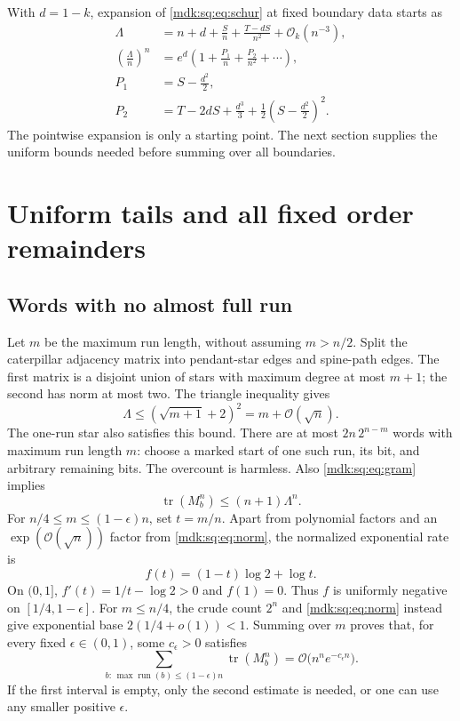 \documentclass[11pt,letterpaper]{article}
\numberwithin{equation}{section}
\theoremstyle{remark}\newtheorem{remark}[theorem]{Remark}
\newcommand{\Oh}{\mathcal O}\newcommand{\Q}{\mathbb Q}\newcommand{\N}{\mathbb N}\newcommand{\R}{\mathbb R}
\DeclareMathOperator{\tr}{tr}\DeclareMathOperator{\TV}{TV}
\begin{document}
With $d=1-k$, expansion of \eqref{mdk:sq:eq:schur} at fixed boundary data starts as
\begin{align}
\Lambda&=n+d+\frac S n+\frac{T-dS}{n^2}+\Oh_k(n^{-3}),\label{mdk:sq:eq:lambda-first}\\
\left(\frac\Lambda n\right)^n
&=e^d\left(1+\frac{P_1}{n}+\frac{P_2}{n^2}+\cdots\right),\label{mdk:sq:eq:P-formal}\\
P_1&=S-\frac{d^2}{2},\nonumber\\
P_2&=T-2dS+\frac{d^3}{3}+\frac12\left(S-\frac{d^2}{2}\right)^2.\nonumber
\end{align}
The pointwise expansion is only a starting point. The next section supplies the uniform bounds needed before summing over all boundaries.

\section{Uniform tails and all fixed order remainders}\label{mdk:sq:sec:uniform}
\subsection{Words with no almost full run}
Let $m$ be the maximum run length, without assuming $m>n/2$. Split the caterpillar adjacency matrix into pendant-star edges and spine-path edges. The first matrix is a disjoint union of stars with maximum degree at most $m+1$; the second has norm at most two. The triangle inequality gives
\begin{equation}\label{mdk:sq:eq:norm}
\Lambda\le(\sqrt{m+1}+2)^2=m+\Oh(\sqrt n).
\end{equation}
The one-run star also satisfies this bound. There are at most $2n\,2^{n-m}$ words with maximum run length $m$: choose a marked start of one such run, its bit, and arbitrary remaining bits. The overcount is harmless. Also \eqref{mdk:sq:eq:gram} implies
\[
\tr(M_b^n)\le(n+1)\Lambda^n.
\]
For $n/4\le m\le(1-\epsilon)n$, set $t=m/n$. Apart from polynomial factors and an $\exp(\Oh(\sqrt n))$ factor from \eqref{mdk:sq:eq:norm}, the normalized exponential rate is
\[
f(t)=(1-t)\log2+\log t.
\]
On $(0,1]$, $f'(t)=1/t-\log2>0$ and $f(1)=0$. Thus $f$ is uniformly negative on $[1/4,1-\epsilon]$. For $m\le n/4$, the crude count $2^n$ and \eqref{mdk:sq:eq:norm} instead give exponential base $2(1/4+o(1))<1$. Summing over $m$ proves that, for every fixed $\epsilon\in(0,1)$, some $c_\epsilon>0$ satisfies
\begin{equation}\label{mdk:sq:eq:bulk}
\sum_{b:\,\max\operatorname{run}(b)\le(1-\epsilon)n}\tr(M_b^n)
=\Oh\bigl(n^n e^{-c_\epsilon n}\bigr).
\end{equation}
If the first interval is empty, only the second estimate is needed, or one can use any smaller positive $\epsilon$.
\end{document}
